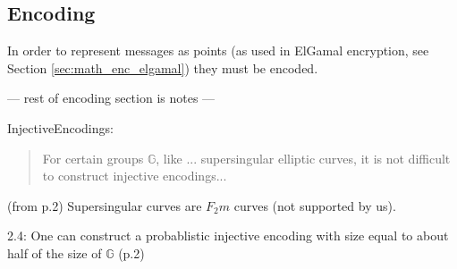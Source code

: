 \subsection{Encoding}
\label{sec:math_encoding}

In order to represent messages as points (as used in ElGamal encryption, see Section \ref{sec:math_enc_elgamal}) they must be encoded.

--- rest of encoding section is notes ---

InjectiveEncodings:

\begin{quote}
    For certain groups \(\mathbb{G}\), like ... supersingular elliptic curves, it is not difficult to construct injective
	encodings...
\end{quote}

(from p.2) Supersingular curves are \(F_2m\) curves (not supported by us).

2.4: One can construct a probablistic injective encoding with size equal to about half of the size of \(\mathbb{G}\) (p.2)